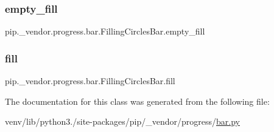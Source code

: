\subsubsection{\texorpdfstring{empty\+\_\+fill}{empty\_fill}}
{\footnotesize\ttfamily pip.\+\_\+vendor.\+progress.\+bar.\+Filling\+Circles\+Bar.\+empty\+\_\+fill\hspace{0.3cm}{\ttfamily [static]}}

\mbox{\label{classpip_1_1__vendor_1_1progress_1_1bar_1_1FillingCirclesBar_a614dbc63f5d66cb86f8116c92b815611}} 
\subsubsection{\texorpdfstring{fill}{fill}}
{\footnotesize\ttfamily pip.\+\_\+vendor.\+progress.\+bar.\+Filling\+Circles\+Bar.\+fill\hspace{0.3cm}{\ttfamily [static]}}



The documentation for this class was generated from the following file\+:\begin{DoxyCompactItemize}
\item 
venv/lib/python3./site-\/packages/pip/\+\_\+vendor/progress/\hyperlink{bar_8py}{bar.\+py}\end{DoxyCompactItemize}
